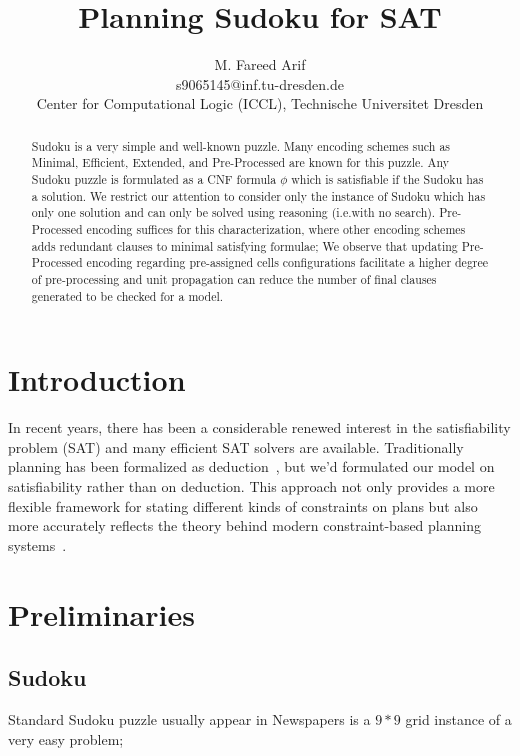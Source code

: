 \documentclass[letterpaper]{article}
\begin{document}
%

\title{Planning Sudoku for SAT}
\author{M. Fareed Arif\\
              s9065145@inf.tu-dresden.de\\
Center for Computational Logic (ICCL), Technische Universitet Dresden
}

\maketitle

\begin{abstract}
Sudoku is a very simple and well-known puzzle. Many encoding schemes such as Minimal, Efficient, Extended, and Pre-Processed are known for this puzzle. Any Sudoku puzzle is formulated as a CNF formula $\phi$ which is satisfiable if the Sudoku has a solution. We restrict our attention to consider only the instance of Sudoku which has only one solution and can only be solved using reasoning (i.e.with no search). Pre-Processed encoding suffices for this characterization, where other encoding schemes adds redundant clauses to minimal satisfying formulae; We observe that updating Pre-Processed encoding regarding pre-assigned cells configurations facilitate a higher degree of pre-processing and unit propagation can reduce the number of final clauses generated to be checked for a model.
\end{abstract}

\section{Introduction}
In recent years, there has been a considerable renewed interest in the satisfiability problem (SAT) and many efficient SAT solvers are available. Traditionally planning has been formalized as deduction~\citet{McCarthy1969}, but we'd formulated our model on satisfiability rather than on deduction. This approach not only provides a more flexible framework for stating different kinds of constraints on plans but also more accurately reflects the theory behind modern constraint-based planning systems~\citet{Henry2006}.

\section{Preliminaries}

\subsection{Sudoku}
Standard Sudoku puzzle usually appear in Newspapers is a $9\ast9$ grid instance of a very easy problem;
\end{document}
